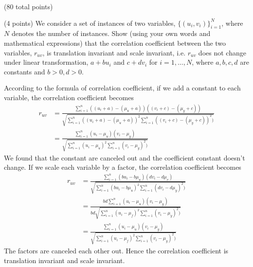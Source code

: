 \documentclass[12pt]{article}
\begin{document}
\begin{question}{(80 total points) \qOneTitle}
\begin{subquestion}
\end{subquestion}

\begin{subquestion}{(4 points)
    We consider a set of instances of two variables, $\{(u_i, v_i)\}_{i=1}^N$,
    where $N$ denotes the number of instances.
    Show (using your own words and mathematical expressions) that the correlation coefficient between the two variables, $r_{uv}$, is translation invariant and scale invariant,
    i.e. $r_{uv}$ does not change under linear transformation, $a + bu_i$ and $c + dv_i$ for $i=1,\ldots,N$, where $a,b,c,d$ are constants and $b>0, d>0$.
    }


  \begin{answerbox}{0.4\textheight}
    According to the formula of correlation coefficient, if we add a constant to each variable, the correlation coefficient becomes
    \begin{align}
        r_{uv}&=\frac{\sum_{i=1}^{n}((u_i+a)-(\mu_u+a))((v_i+c)-(\mu_y+c))}{\sqrt{\sum_{i=1}^{n}((u_i+a)-(\mu_u+a))^2\sum_{i=1}^{n}((v_i+c)-(\mu_y+c))^2)}}\\
        &=\frac{\sum_{i=1}^{n}(u_i-\mu_u)(v_i-\mu_y)}{\sqrt{\sum_{i=1}^{n}(u_i-\mu_u)^2\sum_{i=1}^{n}(v_i-\mu_y)^2)}}
    \end{align}
    We found that the constant are canceled out and the coefficient constant doesn't change.
    If we scale each variable by a factor, the correlation coefficient becomes
    \begin{align}
        r_{uv}&=\frac{\sum_{i=1}^{n}(bu_i-b\mu_u)(dv_i-d\mu_v)}{\sqrt{\sum_{i=1}^{n}(bu_i-b\mu_u)^2\sum_{i=1}^{n}(dv_i-d\mu_y)^2)}}\\
        &=\frac{bd\sum_{i=1}^{n}(u_i-\mu_u)(v_i-\mu_y)}{bd\sqrt{\sum_{i=1}^{n}(u_i-\mu_f)^2\sum_{i=1}^{n}(v_i-\mu_y)^2)}}\\
        &=\frac{\sum_{i=1}^{n}(u_i-\mu_u)(v_i-\mu_y)}{\sqrt{\sum_{i=1}^{n}(u_i-\mu_f)^2\sum_{i=1}^{n}(v_i-\mu_y)^2)}}
    \end{align}
    The factors are canceled each other out. Hence the correlation coefficient is translation invariant and scale invariant.
  \end{answerbox}
  


\end{subquestion}


\end{question}
\end{document}
